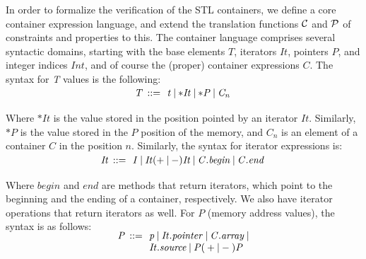 \documentclass[a4paper]{llncs}
\begin{document}
In order to formalize the verification of the STL containers,
we define a core container expression language, and extend the translation
functions $\cal C$ and  $\cal P$ of constraints and properties to this.
The container language comprises several syntactic domains, starting with
the base elements $\mathit{T}$, iterators $\mathit{It}$, pointers $\mathit{P}$,
and integer indices $\mathit{Int}$, and of course the (proper)
container expressions $\mathit{C}$. The syntax for \emph{T} values is the following:
%
\[\begin{array}{r@{\:\:}c@{\:\:}l}\label{element-semantics}
\\[-5ex]
\mathit{T}   & ::= & \: \mathit{t} \: | \: \mathit{*It} \: | \: \mathit{*P} \: | \: \mathit{C_n} \:  \\
\end{array}
\]
%
Where $\mathit{*It}$ is the value stored in the position pointed
by an iterator $\mathit{It}$. Similarly, $\mathit{*P}$ is the value
stored in the $P$ position of the memory, and $\mathit{C_n}$ is
an element of a container $C$ in the position $n$.
Similarly, the syntax for iterator expressions is:
%
\[\begin{array}{r@{\:\:}c@{\:\:}l}\label{iterator-semantics}
\\[-5ex]
\mathit{It}   & ::= & \: \mathit{I} \: | \: \mathit{It} ( + \: | \: - ) \mathit{It} \: | \: \mathit{C.begin} \: | \: \mathit{C.end} \:  \\
\end{array}
\]
%
Where $begin$ and $end$ are methods
that return iterators, which point to the beginning
and the ending of a container, respectively. We also have
iterator operations that return iterators as well.
For $P$ (memory address values), the syntax is as follows:
%
\[\begin{array}{r@{\:\:}c@{\:\:}l}\label{pointer-semantics}
\\[-5ex]
\mathit{P}  & ::= & \: \mathit{p} \: | \: \mathit{It.pointer} \: | \: \mathit{C.array} \: | \\
            &     & \: \mathit{It.source} \: | \: \mathit{P}  ( \: + \: | \: - \: )  \textit{P} \: \\
\end{array}
\]
\end{document}
